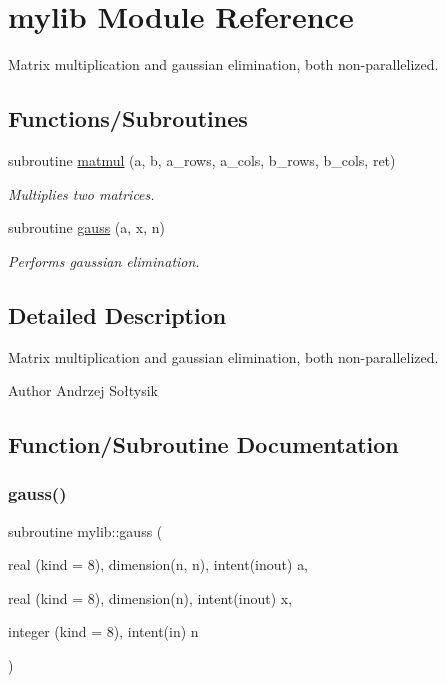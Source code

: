 \hypertarget{namespacemylib}{}\section{mylib Module Reference}
\label{namespacemylib}


Matrix multiplication and gaussian elimination, both non-\/parallelized.  


\subsection*{Functions/\+Subroutines}
\begin{DoxyCompactItemize}
\item 
subroutine \mbox{\hyperlink{namespacemylib_ac17c34e6e3d726dd380e490dc4f20e23}{matmul}} (a, b, a\+\_\+rows, a\+\_\+cols, b\+\_\+rows, b\+\_\+cols, ret)
\begin{DoxyCompactList}\small\item\em Multiplies two matrices. \end{DoxyCompactList}\item 
subroutine \mbox{\hyperlink{namespacemylib_a83c3f9412da2b661a80b2ca3b8c04663}{gauss}} (a, x, n)
\begin{DoxyCompactList}\small\item\em Performs gaussian elimination. \end{DoxyCompactList}\end{DoxyCompactItemize}


\subsection{Detailed Description}
Matrix multiplication and gaussian elimination, both non-\/parallelized. 

\begin{DoxyAuthor}{Author}
Andrzej Sołtysik 
\end{DoxyAuthor}


\subsection{Function/\+Subroutine Documentation}
\mbox{\label{namespacemylib_a83c3f9412da2b661a80b2ca3b8c04663}} 
\subsubsection{\texorpdfstring{gauss()}{gauss()}}
{\footnotesize\ttfamily subroutine mylib\+::gauss (\begin{DoxyParamCaption}\item[{real (kind = 8), dimension(n, n), intent(inout)}]{a,  }\item[{real (kind = 8), dimension(n), intent(inout)}]{x,  }\item[{integer (kind = 8), intent(in)}]{n }\end{DoxyParamCaption})}



